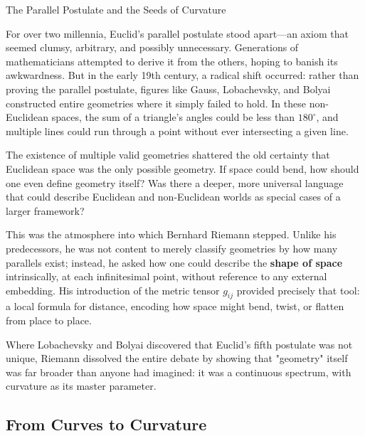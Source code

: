 \begin{HistoricalSidebar}{The Parallel Postulate and the Seeds of Curvature}

  For over two millennia, Euclid's parallel postulate stood apart—an axiom that seemed clumsy, arbitrary, 
  and possibly unnecessary. Generations of mathematicians attempted to derive it from the others, hoping to banish 
  its awkwardness. But in the early 19th century, a radical shift occurred: rather than proving the parallel 
  postulate, figures like Gauss, Lobachevsky, and Bolyai constructed entire geometries where it simply failed 
  to hold. In these non-Euclidean spaces, the sum of a triangle’s angles could be less than \(180^\circ\), and 
  multiple lines could run through a point without ever intersecting a given line.

  \medskip
  
  The existence of multiple valid geometries shattered the old certainty that Euclidean space was the only possible 
  geometry. If space could bend, how should one even define geometry itself? Was there a deeper, more universal 
  language that could describe Euclidean and non-Euclidean worlds as special cases of a larger framework?

  \medskip
  
  This was the atmosphere into which Bernhard Riemann stepped. Unlike his predecessors, he was not content to 
  merely classify geometries by how many parallels exist; instead, he asked how one could describe the 
  \textbf{shape of space} intrinsically, at each infinitesimal point, without reference to any external embedding. 
  His introduction of the metric tensor \(g_{ij}\) provided precisely that tool: a local formula for distance, 
  encoding how space might bend, twist, or flatten from place to place.

  \medskip
  
  Where Lobachevsky and Bolyai discovered that Euclid’s fifth postulate was not unique, Riemann dissolved the 
  entire debate by showing that "geometry" itself was far broader than anyone had imagined: it was a continuous 
  spectrum, with curvature as its master parameter.
\end{HistoricalSidebar}

    




\subsection{From Curves to Curvature}

